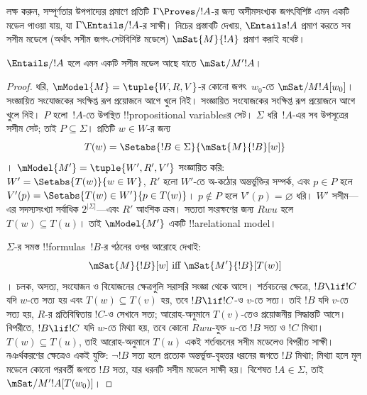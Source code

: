 \documentclass[../../../include/open-logic-section]{subfiles}
\begin{document}

লক্ষ করুন, সম্পূর্ণতার উপপাদ্যের প্রমাণে প্রতিটি
$\Gamma \Proves/ !A$-র জন্য অসীমসংখ্যক জগৎবিশিষ্ট এমন একটি
মডেল পাওয়া যায়, যা $\Gamma \Entails/ !A$-র সাক্ষী। নিচের
প্রস্তাবটি দেখায়, $\Entails !A$ প্রমাণ করতে সব সসীম মডেলে
(অর্থাৎ সসীম জগৎ-সেটবিশিষ্ট মডেলে) $\mSat{M}{!A}$ প্রমাণ
করাই যথেষ্ট।

\begin{thm}
  $\Entails/ !A$ হলে এমন একটি সসীম মডেল আছে যাতে
  $\mSat/{M'}{!A}$।
\end{thm}

\begin{proof}
  ধরি, $\mModel{M}=\tuple{W, R, V}$-র কোনো জগৎ~$w_0$-তে
  $\mSat/{M}{!A}[w_0]$। সংজ্ঞায়িত সংযোজকের সংক্ষিপ্ত রূপ প্রয়োজনে আগে খুলে নিই। সংজ্ঞায়িত সংযোজকের সংক্ষিপ্ত রূপ প্রয়োজনে আগে খুলে নিই। $P$ হলো~$!A$-তে উপস্থিত
  !!{propositional variable}sর সেট। $\Sigma$ ধরি~$!A$-এর
  সব উপসূত্রের সসীম সেট; তাই $P \subseteq \Sigma$।
  প্রতিটি $w \in W$-র জন্য
  \[
    T(w)=\Setabs{!B\in\Sigma}{\mSat{M}{!B}[w]}
  \]।
  $\mModel{M'}=\tuple{W', R', V'}$ সংজ্ঞায়িত করি:
  $W'=\Setabs{T(w)}{w\in W}$, $R'$ হলো $W'$-তে অ-কঠোর অন্তর্ভুক্তির
  সম্পর্ক, এবং $p\in P$ হলে
  $V'(p)=\Setabs{T(w)\in W'}{p\in T(w)}$। $p\notin P$ হলে
  $V'(p)=\varnothing$ ধরি। $W'$ সসীম—এর সদস্যসংখ্যা
  সর্বাধিক $2^{|\Sigma|}$—এবং $R'$ আংশিক ক্রম। সত্যতা
  সংরক্ষণের জন্য $Rwu$ হলে $T(w)\subseteq T(u)$। তাই
  $\mModel{M'}$ একটি !!a{relational model}।

  $\Sigma$-র সমস্ত !!{formula}s~$!B$-র গঠনের ওপর আরোহে দেখাই:
  \[
    \mSat{M}{!B}[w] \text{ iff } \mSat{M'}{!B}[{T(w)}]
  \]।
  চলক, অসত্য, সংযোজন ও বিযোজনের ক্ষেত্রগুলি সরাসরি সংজ্ঞা
  থেকে আসে। শর্তবচনের ক্ষেত্রে, $!B\lif !C$ যদি $w$-তে সত্য
  হয় এবং $T(w)\subseteq T(v)$ হয়, তবে $!B\lif !C$-ও $v$-তে
  সত্য। তাই $!B$ যদি $v$-তে সত্য হয়, $R$-র প্রতিবিম্বিতায়
  $!C$-ও সেখানে সত্য; আরোহ-অনুমানে $T(v)$-তেও প্রয়োজনীয়
  সিদ্ধান্তটি আসে। বিপরীতে, $!B\lif !C$ যদি $w$-তে মিথ্যা হয়,
  তবে কোনো $Rwu$-যুক্ত $u$-তে $!B$ সত্য ও $!C$ মিথ্যা।
  $T(w)\subseteq T(u)$, তাই আরোহ-অনুমানে $T(u)$ একই শর্তবচনের
  সসীম মডেলেও বিপরীত সাক্ষী। নঞর্থকরণের ক্ষেত্রেও একই যুক্তি:
  $\lnot !B$ সত্য হলে প্রত্যেক অন্তর্ভুক্ত-বৃহত্তর ধরনের জগতে
  $!B$ মিথ্যা; মিথ্যা হলে মূল মডেলে কোনো পরবর্তী জগতে $!B$
  সত্য, যার ধরনটি সসীম মডেলে সাক্ষী হয়।
  বিশেষত $!A\in\Sigma$, তাই $\mSat/{M'}{!A}[T(w_0)]$।
\end{proof}
\end{document}
